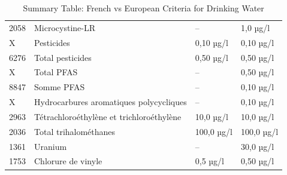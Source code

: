 \documentclass{article}
\begin{document}
\begin{table}[H]
\begin{tabular}{|l|l|l|l|}
2058 & Microcystine-LR & -- & 1,0 µg/l \\
X & Pesticides & 0,10 µg/l & 0,10 µg/l \\
6276 & Total pesticides & 0,50 µg/l & 0,50 µg/l \\
X & Total PFAS & -- & 0,50 µg/l \\
8847 & Somme PFAS & -- & 0,10 µg/l \\
X & Hydrocarbures aromatiques polycycliques & -- & 0,10 µg/l \\
2963 & Tétrachloroéthylène et trichloroéthylène & 10,0 µg/l & 10,0 µg/l \\
2036 & Total trihalométhanes & 100,0 µg/l & 100,0 µg/l \\
1361 & Uranium & -- & 30,0 µg/l \\
1753 & Chlorure de vinyle & 0,5 µg/l & 0,50 µg/l \\
\hline
\end{tabular}
\caption{Summary Table: French vs European Criteria for Drinking Water}
\end{table}
\end{document}
